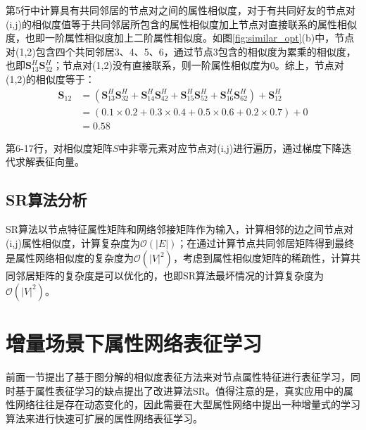 第5行中计算具有共同邻居的节点对之间的属性相似度，对于有共同好友的节点对(i,j)的相似度值等于共同邻居所包含的属性相似度加上节点对直接联系的属性相似度，也即一阶属性相似度加上二阶属性相似度。如图\ref{fig:similar_opt}(b)中，节点对(1,2)包含四个共同邻居3、4、5、6，通过节点3包含的相似度为累乘的相似度，也即$\textbf{S}^H_{13}\textbf{S}^H_{32}$；节点对(1,2)没有直接联系，则一阶属性相似度为0。综上，节点对(1,2)的相似度等于：
\begin{equation}
\begin{aligned}
\textbf{S}_{12} &= (\textbf{S}^H_{13}\textbf{S}^H_{32}+ \textbf{S}^H_{14}\textbf{S}^H_{42}+ \textbf{S}^H_{15}\textbf{S}^H_{52}+\textbf{S}^H_{16}\textbf{S}^H_{62})+ \textbf{S}^H_{12} \\
 &=(0.1\times 0.2 + 0.3\times 0.4 +0.5\times 0.6 +0.2\times 0.7) + 0 \\
 &= 0.58
\end{aligned} 
\end{equation}

第6-17行，对相似度矩阵$S$中非零元素对应节点对(i,j)进行遍历，通过梯度下降迭代求解表征向量。
\subsection{SR算法分析}
SR算法以节点特征属性矩阵和网络邻接矩阵作为输入，计算相邻的边之间节点对(i,j)属性相似度，计算复杂度为$\mathcal{O}(|E|)$；在通过计算节点共同邻居矩阵得到最终是属性网络相似度的复杂度为$\mathcal{O}(|V|^2)$，考虑到属性相似度矩阵的稀疏性，计算共同邻居矩阵的复杂度是可以优化的，也即SR算法最坏情况的计算复杂度为$\mathcal{O}(|V|^2)$。

\section{增量场景下属性网络表征学习}
前面一节提出了基于图分解的相似度表征方法来对节点属性特征进行表征学习，同时基于属性表征学习的缺点提出了改进算法SR。值得注意的是，真实应用中的属性网络往往是存在动态变化的，因此需要在大型属性网络中提出一种增量式的学习算法来进行快速可扩展的属性网络表征学习。  

